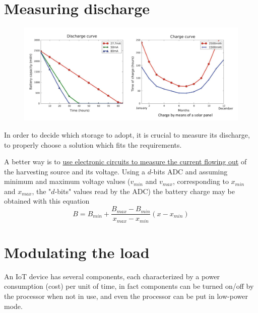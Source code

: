 \section{Measuring discharge}
\begin{figure}[htbp]
   \centering
   \includegraphics{images/charge_discharge.png}
   \label{fig:chargedischarge}
\end{figure}

In order to decide which storage to adopt, it is crucial to measure its discharge, to properly choose a solution which fits the requirements.

      
A better way is to \ul{use electronic circuits to measure the current flowing out} of the harvesting source and its voltage.
Using a $d$-bits ADC and assuming minimum and maximum voltage values ($v_{min}$ and $v_{max}$, corresponding to $x_{min}$ and $x_{max}$, the "$d$-bits" values read by the ADC) the battery charge may be obtained with this equation
\[B = B_{min} + \frac{B_{max} - B_{min}}{x_{max} - x_{min}}(x - x_{min})\]

\section{Modulating the load}

An IoT device has several components, each
characterized by a power consumption (cost)
per unit of time,
in fact components can be turned on/off by the
processor when not in use, and even the processor can be put in low-power mode.

